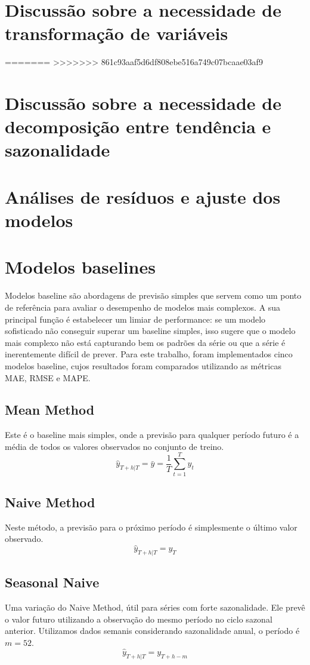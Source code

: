 \documentclass{article}
\begin{document}
\section*{Discussão sobre a necessidade de transformação de variáveis}

=======
>>>>>>> 861c93aaf5d6df808ebe516a749c07bcaae03af9

\section*{Discussão sobre a necessidade de decomposição entre tendência e sazonalidade}

\section*{Análises de resíduos e ajuste dos modelos}
\section*{Modelos baselines}

Modelos baseline são abordagens de previsão simples que servem como um ponto de referência para avaliar o desempenho de modelos mais complexos. A sua principal função é estabelecer um limiar de performance: se um modelo sofisticado não conseguir superar um baseline simples, isso sugere que o modelo mais complexo não está capturando bem os padrões da série ou que a série é inerentemente difícil de prever. Para este trabalho, foram implementados cinco modelos baseline, cujos resultados foram comparados utilizando as métricas MAE, RMSE e MAPE.

\subsection*{Mean Method}
Este é o baseline mais simples, onde a previsão para qualquer período futuro é a média de todos os valores observados no conjunto de treino.
$$ \hat{y}_{T+h|T} = \bar{y} = \frac{1}{T}\sum_{t=1}^{T}y_t $$

\subsection*{Naive Method}
Neste método, a previsão para o próximo período é simplesmente o último valor observado.
$$ \hat{y}_{T+h|T} = y_T $$

\subsection*{Seasonal Naive}
Uma variação do Naive Method, útil para séries com forte sazonalidade. Ele prevê o valor futuro utilizando a observação do mesmo período no ciclo sazonal anterior. Utilizamos dados semanis considerando sazonalidade anual, o período é $m=52$.
$$ \hat{y}_{T+h|T} = y_{T+h-m} $$
\end{document}
